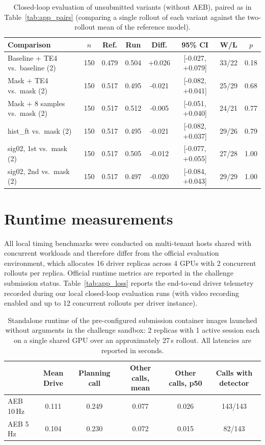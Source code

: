\begin{table}[!htb]
\centering\scriptsize
\caption{Closed-loop evaluation of unsubmitted variants (without AEB), paired as in Table~\ref{tab:app_pairs} (comparing a single rollout of each variant against the two-rollout mean of the reference model).}
\label{tab:app_others}
\begin{tabular}{lccccccc}
\toprule
Comparison & $n$ & Ref. & Run & Diff. & 95\% CI & W/L & $p$ \\
\midrule
Baseline + TE4 vs.\ baseline (2) & 150 & 0.479 & 0.504 & +0.026 & [-0.027, +0.079] & 33/22 & 0.18 \\
Mask + TE4 vs.\ mask (2) & 150 & 0.517 & 0.495 & -0.021 & [-0.082, +0.041] & 25/29 & 0.68 \\
Mask + 8 samples vs.\ mask (2) & 150 & 0.517 & 0.512 & -0.005 & [-0.051, +0.040] & 24/21 & 0.77 \\
hist\_ft vs.\ mask (2) & 150 & 0.517 & 0.495 & -0.021 & [-0.082, +0.037] & 29/26 & 0.79 \\
sig02, 1st vs.\ mask (2) & 150 & 0.517 & 0.505 & -0.012 & [-0.077, +0.055] & 27/28 & 1.00 \\
sig02, 2nd vs.\ mask (2) & 150 & 0.517 & 0.497 & -0.020 & [-0.084, +0.043] & 29/29 & 1.00 \\
\bottomrule
\end{tabular}
\end{table}

\FloatBarrier
\section{Runtime measurements}
\label{app:runtime}
All local timing benchmarks were conducted on multi-tenant hosts shared with concurrent workloads and therefore differ from the official evaluation environment, which allocates 16 driver replicas across 4 GPUs with 2 concurrent rollouts per replica. Official runtime metrics are reported in the challenge submission status. Table~\ref{tab:app_loss} reports the end-to-end driver telemetry recorded during our local closed-loop evaluation runs (with video recording enabled and up to 12 concurrent rollouts per driver instance).

\begin{table}[!htb]
\centering\scriptsize
\caption{Standalone runtime of the pre-configured submission container images launched without arguments in the challenge sandbox: 2 replicas with 1 active session each on a single shared GPU over an approximately 27\,s rollout. All latencies are reported in seconds.}
\label{tab:app_sub}
\begin{tabular}{lccccc}
\toprule
 & Mean Drive & Planning call & Other calls, mean & Other calls, p50 & Calls with detector \\
\midrule
AEB 10\,Hz & 0.111 & 0.249 & 0.077 & 0.026 & 143/143 \\
AEB 5\,Hz & 0.104 & 0.230 & 0.072 & 0.015 & 82/143 \\
\bottomrule
\end{tabular}
\end{table}

